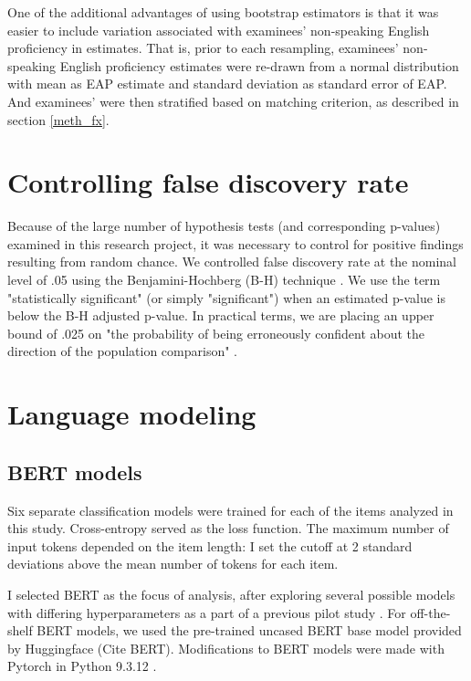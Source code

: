 \documentclass [PhD] {uclathes}
\begin{document}
One of the additional advantages of using bootstrap estimators is that it was easier to include variation associated with examinees’ non-speaking English proficiency in estimates. That is, prior to each resampling, examinees’ non-speaking English proficiency estimates were re-drawn from a normal distribution with mean as EAP estimate and standard deviation as standard error of EAP. And examinees’ were then stratified based on matching criterion, as described in section \ref{meth_fx}. 

\section{Controlling false discovery rate}
\label{meth_bh}

Because of the large number of hypothesis tests (and corresponding p-values) examined in this research project, it was necessary to control for positive findings resulting from random chance. We controlled false discovery rate at the nominal level of .05 using the Benjamini-Hochberg (B-H) technique \citep{benjamini1995controlling}. We use the term "statistically significant" (or simply "significant") when an estimated p-value is below the B-H adjusted p-value. In practical terms, we are placing an upper bound of .025 on "the probability of being erroneously confident about the direction of the population comparison" \citep[][p. 43]{williams1999controlling}.

\section{Language modeling}
\label{sec:meth_bert}

\subsection{BERT models}

Six separate classification models were trained for each of the items analyzed in this study. Cross-entropy served as the loss function. The maximum number of input tokens depended on the item length: I set the cutoff at 2 standard deviations above the mean number of tokens for each item. 

I selected BERT as the focus of analysis, after exploring several possible models with differing hyperparameters as a part of a previous pilot study \citep{kwako2022using}. For off-the-shelf BERT models, we used the pre-trained uncased BERT base model provided by Huggingface \citep{wolf_transformers_2020} (Cite BERT). Modifications to BERT models were made with Pytorch \citep{paszke_pytorch_2019} in Python 9.3.12 \citep{python2022}. 
\end{document}
